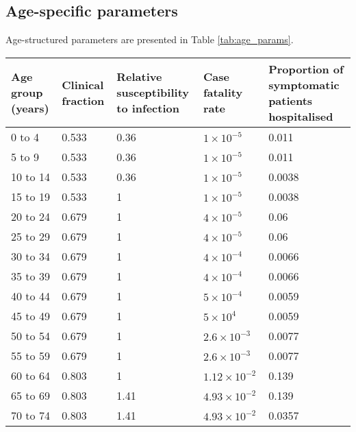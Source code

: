\subsection{Age-specific parameters}
Age-structured parameters are presented in Table \ref{tab:age_params}.

\begin{table}
    \begin{threeparttable}
    \begin{tabularx}{\textwidth}{| X | X | X | X | X |}
        \hline
        Age group (years) & Clinical fraction\tnote{a} & 
        Relative susceptibility to infection & Case fatality rate & 
        Proportion of symptomatic patients hospitalised \\
        \hline
        0 to 4 & 0.533 & 0.36 & $1\times10^{-5}$ & 0.011 \\
        \hline
        5 to 9 & 0.533 & 0.36 & $1\times10^{-5}$ & 0.011 \\
        \hline
        10 to 14 & 0.533 & 0.36 & $1\times10^{-5}$ & 0.0038 \\
        \hline
        15 to 19 & 0.533 & 1 & $1\times10^{-5}$ & 0.0038 \\
        \hline
        20 to 24 & 0.679 & 1 & $4\times10^{-5}$ & 0.06 \\
        \hline
        25 to 29 & 0.679 & 1 & $4\times10^{-5}$ & 0.06 \\
        \hline
        30 to 34 & 0.679 & 1 & $4\times10^{-4}$ & 0.0066 \\
        \hline
        35 to 39 & 0.679 & 1 & $4\times10^{-4}$ & 0.0066 \\
        \hline
        40 to 44 & 0.679 & 1 & $5\times10^{-4}$ & 0.0059 \\
        \hline
        45 to 49 & 0.679 & 1 & $5\times10^{4}$ & 0.0059 \\
        \hline
        50 to 54 & 0.679 & 1 & $2.6\times10^{-3}$ & 0.0077 \\
        \hline
        55 to 59 & 0.679 & 1 & $2.6\times10^{-3}$ & 0.0077 \\
        \hline
        60 to 64 & 0.803 & 1 & $1.12\times10^{-2}$ & 0.139 \\
        \hline
        65 to 69 & 0.803 & 1.41 & $4.93\times10^{-2}$ & 0.139 \\
        \hline
        70 to 74 & 0.803 & 1.41 & $4.93\times10^{-2}$ & 0.0357 \\

\end{tabularx}
\end{threeparttable}
\end{table}
